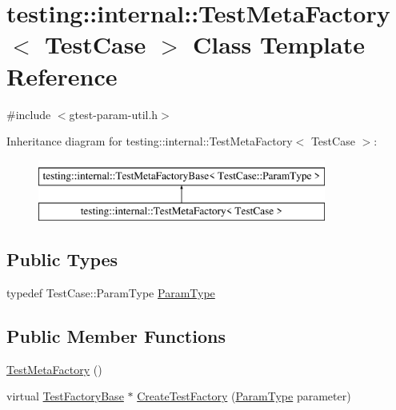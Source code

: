 \hypertarget{classtesting_1_1internal_1_1TestMetaFactory}{}\section{testing\+::internal\+::Test\+Meta\+Factory$<$ Test\+Case $>$ Class Template Reference}
\label{classtesting_1_1internal_1_1TestMetaFactory}


{\ttfamily \#include $<$gtest-\/param-\/util.\+h$>$}

Inheritance diagram for testing\+::internal\+::Test\+Meta\+Factory$<$ Test\+Case $>$\+:\begin{figure}[H]
\begin{center}
\leavevmode
\includegraphics[height=2.000000cm]{classtesting_1_1internal_1_1TestMetaFactory}
\end{center}
\end{figure}
\subsection*{Public Types}
\begin{DoxyCompactItemize}
\item 
typedef Test\+Case\+::\+Param\+Type \mbox{\hyperlink{classtesting_1_1internal_1_1TestMetaFactory_a9c12e442b4389381b948ed669fcf0f84}{Param\+Type}}
\end{DoxyCompactItemize}
\subsection*{Public Member Functions}
\begin{DoxyCompactItemize}
\item 
\mbox{\hyperlink{classtesting_1_1internal_1_1TestMetaFactory_a3eadbf9867b702bcba130a3113a77b71}{Test\+Meta\+Factory}} ()
\item 
virtual \mbox{\hyperlink{classtesting_1_1internal_1_1TestFactoryBase}{Test\+Factory\+Base}} $\ast$ \mbox{\hyperlink{classtesting_1_1internal_1_1TestMetaFactory_ae9f5334c68af309bca8f7ec29d837e38}{Create\+Test\+Factory}} (\mbox{\hyperlink{classtesting_1_1internal_1_1TestMetaFactory_a9c12e442b4389381b948ed669fcf0f84}{Param\+Type}} parameter)
\end{DoxyCompactItemize}


